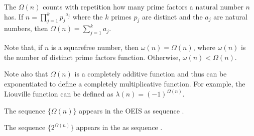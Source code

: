 \documentclass[12pt]{article}
\begin{document}
The  $\Omega(n)$ counts with repetition how many prime factors a natural number $n$ has.  If $\displaystyle n= \prod_{j= 1}^k {p_j}^{a_j}$ where the $k$ primes $p_j$ are distinct and the $a_j$ are natural numbers, then $\displaystyle \Omega(n)=\sum_{j=1}^k a_j$.

Note that, if $n$ is a squarefree number, then $\omega(n)=\Omega(n)$, where $\omega(n)$ is the number of distinct prime factors function.  Otherwise, $\omega(n)<\Omega(n)$.

Note also that $\Omega(n)$ is a completely additive function and thus can be exponentiated to define a completely multiplicative function.  For example, the Liouville function can be defined as $\lambda(n) = (-1)^{\Omega(n)}$.

The sequence $\{\Omega(n)\}$ appears in the OEIS as sequence .

The sequence $\{2^{\Omega(n)}\}$ appears in the  as sequence .
\end{document}
